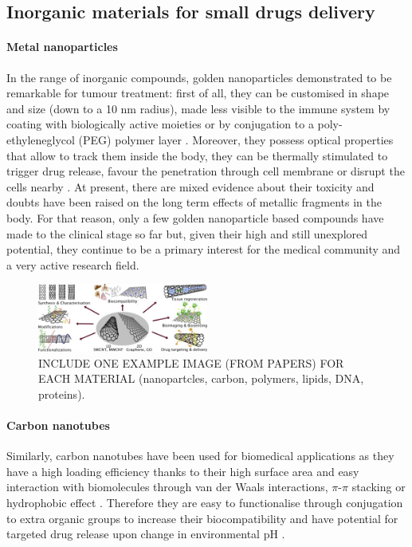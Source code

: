 \subsection{Inorganic materials for small drugs delivery}

\paragraph{Metal nanoparticles} In the range of inorganic compounds, golden nanoparticles demonstrated to be remarkable for tumour treatment: first of all, they can be customised in shape and size (down to a 10 nm radius), made less visible to the immune system by coating with biologically active moieties or by conjugation to a poly-ethyleneglycol (PEG) polymer layer \cite{Singh2018}. Moreover, they possess optical properties that allow to track them inside the body, they can be thermally stimulated to trigger drug release, favour the penetration through cell membrane or disrupt the cells nearby \cite{Boisselier2009}. At present, there are mixed evidence about their toxicity \cite{Boisselier2009} and doubts have been raised on the long term effects of metallic fragments in the body. For that reason, only a few golden nanoparticle based compounds have made to the clinical stage so far \cite{Singh2018} but, given their high and still unexplored potential, they continue to be a primary interest for the medical community and a very active research field.

\begin{figure}
\begin{center}
\includegraphics[width = 0.5\textwidth]{pics/carbon_review.jpg}
\vspace{0.2cm}
\caption[Materials for drug delivery vehicles]{INCLUDE ONE EXAMPLE IMAGE (FROM PAPERS) FOR EACH MATERIAL (nanopartcles, carbon, polymers, lipids, DNA, proteins).} \label{fig:vehicles}
\end{center}
\end{figure}

\paragraph{Carbon nanotubes}
Similarly, carbon nanotubes have been used for biomedical applications as they have a high loading efficiency thanks to their high surface area and easy interaction with biomolecules through van der Waals interactions, $\pi$-$\pi$ stacking or hydrophobic effect \cite{Erol2017}. Therefore they are easy to functionalise through conjugation to extra organic groups to increase their biocompatibility and have potential for targeted drug release upon change in environmental pH \cite{Depan2011}.

